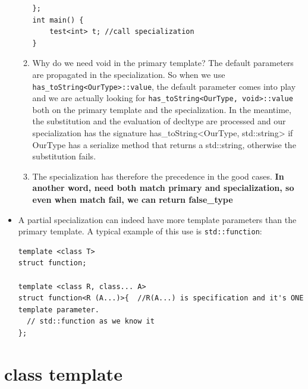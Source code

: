 \documentclass[a4paper,11pt,twoside]{book}
\begin{document}
\begin{itemize}
\begin{enumerate}
\begin{lstlisting}
};
int main() {
	test<int> t; //call specialization
}
\end{lstlisting}
	\item Why do we need void in the primary template? The default parameters are propagated in the specialization. So when we use \texttt{has\_toString<OurType>::value}, the default parameter comes into play and we are actually looking for \texttt{has\_toString<OurType, void>::value} both on the primary template and the specialization. In the meantime, the substitution and the evaluation of decltype are processed and our specialization has the signature has\_toString<OurType, std::string> if OurType has a serialize method that returns a std::string, otherwise the substitution fails. 
	
	\item The specialization has therefore the precedence in the good cases. \textbf{In another word, need both match primary and specialization, so even when match fail, we can return false\_type}

\end{enumerate}



\item A partial specialization can indeed have more template parameters than the primary template. A typical example of this use is \texttt{std::function}: 
\begin{lstlisting}
template <class T>
struct function;

template <class R, class... A>
struct function<R (A...)>{  //R(A...) is specification and it's ONE template parameter.
  // std::function as we know it
};
\end{lstlisting}	

\end{itemize}

\section{class template}
\end{document}
